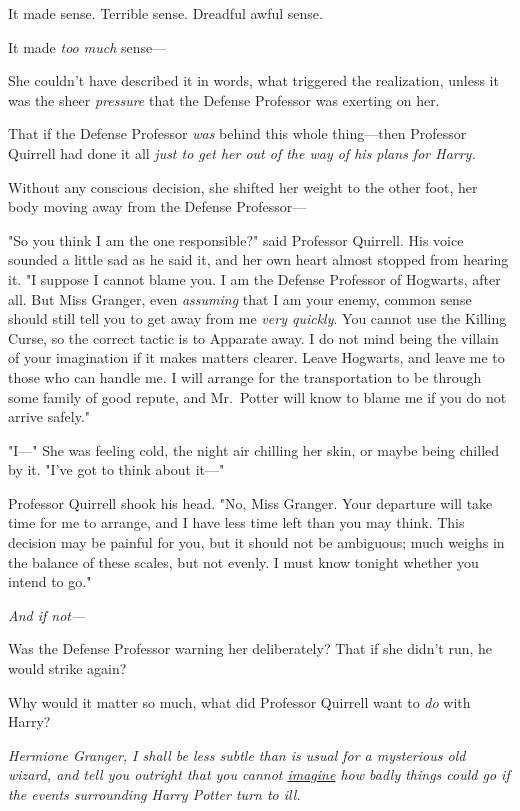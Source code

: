 It made sense. Terrible sense. Dreadful awful sense.

It made \emph{too much} sense---

She couldn't have described it in words, what triggered the realization, unless
it was the sheer \emph{pressure} that the Defense Professor was exerting on her.

That if the Defense Professor \emph{was} behind this whole thing---then
Professor Quirrell had done it all \emph{just to get her out of the way of his
plans for Harry.}

Without any conscious decision, she shifted her weight to the other foot, her
body moving away from the Defense Professor---

"So you think I am the one responsible?" said Professor Quirrell. His voice
sounded a little sad as he said it, and her own heart almost stopped from
hearing it. "I suppose I cannot blame you. I am the Defense Professor of
Hogwarts, after all. But Miss Granger, even \emph{assuming} that I am your
enemy, common sense should still tell you to get away from me \emph{very
quickly}. You cannot use the Killing Curse, so the correct tactic is to
Apparate away. I do not mind being the villain of your imagination if it makes
matters clearer. Leave Hogwarts, and leave me to those who can handle me. I
will arrange for the transportation to be through some family of good repute,
and Mr.~Potter will know to blame me if you do not arrive safely."

"I---" She was feeling cold, the night air chilling her skin, or maybe being
chilled by it. "I've got to think about it---"

Professor Quirrell shook his head. "No, Miss Granger. Your departure will take
time for me to arrange, and I have less time left than you may think. This
decision may be painful for you, but it should not be ambiguous; much weighs in
the balance of these scales, but not evenly. I must know tonight whether you
intend to go."

\emph{And if not---}

Was the Defense Professor warning her deliberately? That if she didn't run, he
would strike again?

Why would it matter so much, what did Professor Quirrell want to \emph{do} with
Harry?

\emph{Hermione Granger, I shall be less subtle than is usual for a mysterious
old wizard, and tell you outright that you cannot \underline{imagine} how badly
things could go if the events surrounding Harry Potter turn to ill.}

